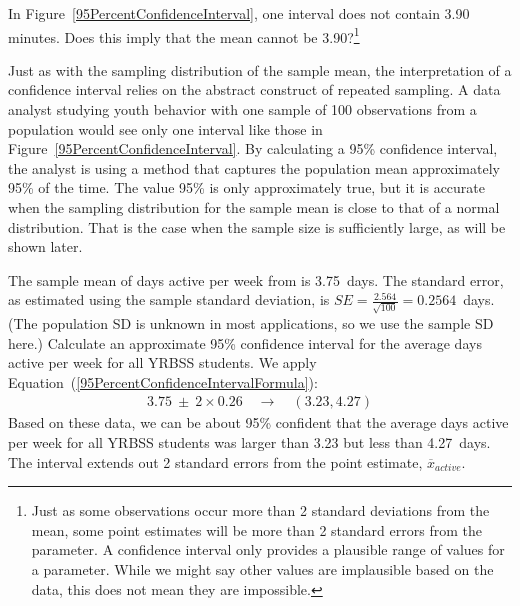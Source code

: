 \begin{spacing}{1.5}
\begin{exercise}
In Figure~\ref{95PercentConfidenceInterval}, one interval does not contain 3.90 minutes. Does this imply that the mean cannot be 3.90?\footnote{Just as some observations occur more than 2 standard deviations from the mean, some point estimates will be more than 2 standard errors from the parameter. A confidence interval only provides a plausible range of values for a parameter. While we might say other values are implausible based on the data, this does not mean they are impossible.}
\end{exercise}

Just as with the sampling distribution of the sample mean, the interpretation of a confidence interval relies on the abstract construct of repeated sampling. A data analyst studying youth behavior with one sample of 100 observations from a population would see only one interval like those in Figure~\ref{95PercentConfidenceInterval}.  By calculating a 95\% confidence interval, the analyst is using a method that captures the population mean approximately 95\% of the time.  The value 95\% is only approximately true, but it is accurate when the sampling distribution for the sample mean is close to that of a normal distribution.  That is the case when the sample size is sufficiently large, as will be shown later.


\begin{example}{The sample mean of days active per week from  is 3.75~days. The standard error, as estimated using the sample standard deviation, is $SE=\frac{2.564}{\sqrt{100}} = 0.2564$~days. (The population SD is unknown in most applications, so we use the sample SD here.) Calculate an approximate 95\% confidence interval for the average days active per week for all YRBSS students.}
We apply Equation~(\ref{95PercentConfidenceIntervalFormula}):
\begin{eqnarray*}
3.75\ \pm\ 2 \times  0.26 \quad \rightarrow \quad (3.23, 4.27)
\end{eqnarray*}
Based on these data, we can be about 95\% confident that the average days active per week for all YRBSS students was larger than 3.23 but less than 4.27~days. The interval extends out 2 standard errors from the point estimate, $\overline{x}_{active}$.
\end{example}


\end{spacing}

